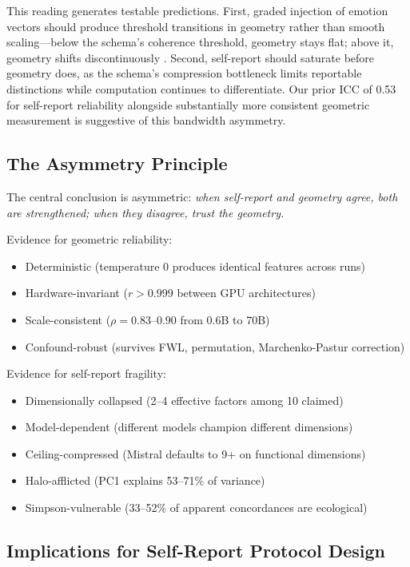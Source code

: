 \documentclass[11pt,a4paper]{article}
\begin{document}
This reading generates testable predictions. First, graded injection of emotion vectors should produce threshold transitions in geometry rather than smooth scaling---below the schema's coherence threshold, geometry stays flat; above it, geometry shifts discontinuously \citep{mckenzie2026endogenous}. Second, self-report should saturate before geometry does, as the schema's compression bottleneck limits reportable distinctions while computation continues to differentiate. Our prior ICC of 0.53 for self-report reliability alongside substantially more consistent geometric measurement is suggestive of this bandwidth asymmetry.

\subsection{The Asymmetry Principle}

The central conclusion is asymmetric: \emph{when self-report and geometry agree, both are strengthened; when they disagree, trust the geometry.}

Evidence for geometric reliability:
\begin{itemize}[nosep]
    \item Deterministic (temperature 0 produces identical features across runs)
    \item Hardware-invariant ($r > 0.999$ between GPU architectures)
    \item Scale-consistent ($\rho = 0.83$--$0.90$ from 0.6B to 70B)
    \item Confound-robust (survives FWL, permutation, Marchenko-Pastur correction)
\end{itemize}

Evidence for self-report fragility:
\begin{itemize}[nosep]
    \item Dimensionally collapsed (2--4 effective factors among 10 claimed)
    \item Model-dependent (different models champion different dimensions)
    \item Ceiling-compressed (Mistral defaults to 9+ on functional dimensions)
    \item Halo-afflicted (PC1 explains 53--71\% of variance)
    \item Simpson-vulnerable (33--52\% of apparent concordances are ecological)
\end{itemize}

\subsection{Implications for Self-Report Protocol Design}
\end{document}
